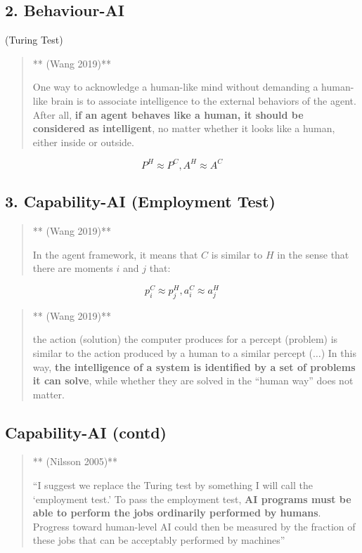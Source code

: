 \documentclass[
  letterpaper,
  DIV=11,
  numbers=noendperiod]{scrartcl}
\begin{document}
\subsection{2. Behaviour-AI}\label{behaviour-ai}

(Turing Test)

\begin{quote}
** (Wang 2019)**

One way to acknowledge a human-like mind without demanding a human-like
brain is to associate intelligence to the external behaviors of the
agent. After all, \textbf{if an agent behaves like a human, it should be
considered as intelligent}, no matter whether it looks like a human,
either inside or outside.
\end{quote}

\[
 P^H \approx P^C, A^H \approx A^C 
\]

\subsection{3. Capability-AI (Employment
Test)}\label{capability-ai-employment-test}

\begin{quote}
** (Wang 2019)**

In the agent framework, it means that \(C\) is similar to \(H\) in the
sense that there are moments \(i\) and \(j\) that:
\end{quote}

\[
 p_i^C \approx p_j^H, a_i^C \approx a_j^H 
\]

\begin{quote}
** (Wang 2019)**

the action (solution) the computer produces for a percept (problem) is
similar to the action produced by a human to a similar percept
(\(\ldots\)) In this way, \textbf{the intelligence of a system is
identified by a set of problems it can solve}, while whether they are
solved in the ``human way'' does not matter.
\end{quote}

\subsection{Capability-AI (contd)}\label{capability-ai-contd}

\begin{quote}
** (Nilsson 2005)**

``I suggest we replace the Turing test by something I will call the
`employment test.' To pass the employment test, \textbf{AI programs must
be able to perform the jobs ordinarily performed by humans}. Progress
toward human-level AI could then be measured by the fraction of these
jobs that can be acceptably performed by machines''
\end{quote}
\end{document}
